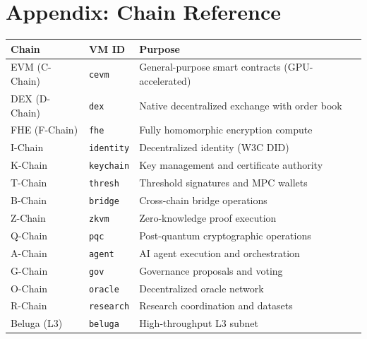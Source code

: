 \section{Appendix: Chain Reference}


\begin{tabularx}{\textwidth}{@{}l l X@{}}
\toprule
\textbf{Chain} & \textbf{VM ID} & \textbf{Purpose} \\
\midrule
EVM (C-Chain)  & \texttt{cevm}    & General-purpose smart contracts (GPU-accelerated) \\
DEX (D-Chain)  & \texttt{dex}     & Native decentralized exchange with order book \\
FHE (F-Chain)  & \texttt{fhe}     & Fully homomorphic encryption compute \\
I-Chain        & \texttt{identity}& Decentralized identity (W3C DID) \\
K-Chain        & \texttt{keychain}& Key management and certificate authority \\
T-Chain        & \texttt{thresh}  & Threshold signatures and MPC wallets \\
B-Chain        & \texttt{bridge}  & Cross-chain bridge operations \\
Z-Chain        & \texttt{zkvm}    & Zero-knowledge proof execution \\
Q-Chain        & \texttt{pqc}     & Post-quantum cryptographic operations \\
A-Chain        & \texttt{agent}   & AI agent execution and orchestration \\
G-Chain        & \texttt{gov}     & Governance proposals and voting \\
O-Chain        & \texttt{oracle}  & Decentralized oracle network \\
R-Chain        & \texttt{research}& Research coordination and datasets \\
Beluga (L3)    & \texttt{beluga}  & High-throughput L3 subnet \\
\bottomrule
\end{tabularx}

